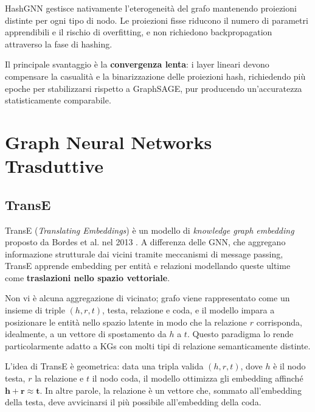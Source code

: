 HashGNN gestisce nativamente l'eterogeneità del grafo mantenendo proiezioni distinte per ogni tipo di nodo. Le proiezioni fisse riducono il numero di parametri apprendibili e il rischio di overfitting, e non richiedono backpropagation attraverso la fase di hashing.

Il principale svantaggio è la \textbf{convergenza lenta}: i layer lineari devono compensare la casualità e la binarizzazione delle proiezioni hash, richiedendo più epoche per stabilizzarsi rispetto a GraphSAGE, pur producendo un'accuratezza statisticamente comparabile.


\section{Graph Neural Networks Trasduttive}
\subsection{TransE}
TransE (\textit{Translating Embeddings}) è un modello di \textit{knowledge graph embedding} proposto da Bordes et al. nel 2013 \cite{bordes2013translating}. A differenza delle GNN, che aggregano informazione strutturale dai vicini tramite meccanismi di message passing, TransE apprende embedding per entità e relazioni modellando queste ultime come \textbf{traslazioni nello spazio vettoriale}. 

Non vi è alcuna aggregazione di vicinato; grafo viene rappresentato come un insieme di triple $(h, r, t)$, testa, relazione e coda, e il modello impara a posizionare le entità nello spazio latente in modo che la relazione $r$ corrisponda, idealmente, a un vettore di spostamento da $h$ a $t$.
Questo paradigma lo rende particolarmente adatto a KGs con molti tipi di relazione semanticamente distinte.

L'idea di TransE è geometrica: data una tripla valida $(h, r, t)$, dove $h$ è il nodo testa, $r$ la relazione e $t$ il nodo coda, il modello ottimizza gli embedding affinché $\mathbf{h} + \mathbf{r} \approx \mathbf{t}$. In altre parole, la relazione è un vettore che, sommato all'embedding della testa, deve avvicinarsi il più possibile all'embedding della coda.

